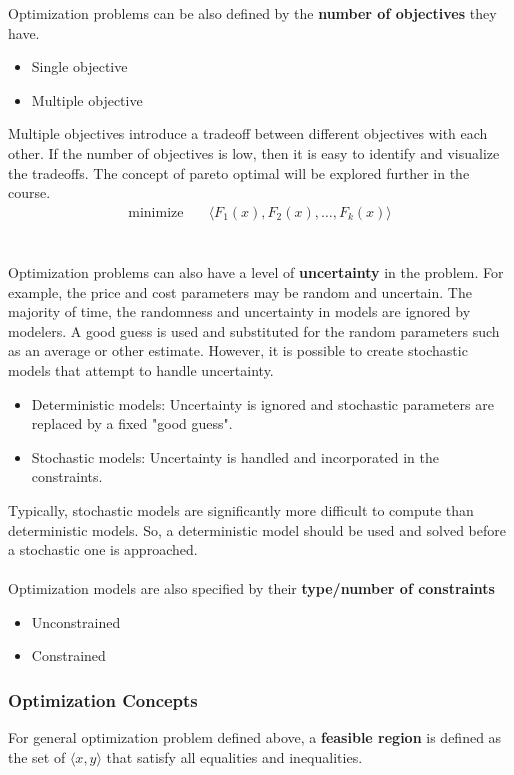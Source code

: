 Optimization problems can be also defined by the \textbf{number of objectives} they have.
\begin{itemize}
    \item Single objective
    \item Multiple objective
\end{itemize}
Multiple objectives introduce a tradeoff between different objectives with each other. If the number of objectives is low, then it is easy to identify and visualize the tradeoffs. The concept of pareto optimal will be explored further in the course.
\begin{align}
  \text{minimize} & \quad \langle F_1(x), F_2(x), \dots, F_k(x) \rangle
\end{align}
\\ \\
Optimization problems can also have a level of \textbf{uncertainty} in the problem. For example, the price and cost parameters may be random and uncertain. The majority of time, the randomness and uncertainty in models are ignored by modelers. A good guess is used and substituted for the random parameters such as an average or other estimate. However, it is possible to create stochastic models that attempt to handle uncertainty.
\begin{itemize}
    \item Deterministic models: Uncertainty is ignored and stochastic parameters are replaced by a fixed "good guess".
    \item Stochastic models: Uncertainty is handled and incorporated in the constraints.
\end{itemize}
Typically, stochastic models are significantly more difficult to compute than deterministic models. So, a deterministic model should be used and solved before a stochastic one is approached. \\ \\
Optimization models are also specified by their \textbf{type/number of constraints}
\begin{itemize}
    \item Unconstrained
    \item Constrained
\end{itemize}

\subsubsection{Optimization Concepts}
For general optimization problem defined above, a \textbf{feasible region} is defined as the set of $\langle x, y \rangle$ that satisfy all equalities and inequalities.


